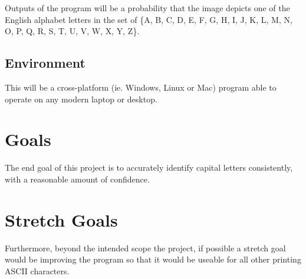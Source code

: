 \documentclass{article}
\begin{document}
Outputs of the program will be a probability that the image depicts one of the English alphabet letters in the 
set of \{A, B, C, D, E, F, G, H, I, J, K, L, M, N, O, P, Q, R, S, T, U, V, W, X, Y, Z\}.

\subsection{Environment}
This will be a cross-platform (ie. Windows, Linux or Mac) program able to operate on any modern laptop or desktop.

\section{Goals}
The end goal of this project is to accurately identify capital letters consistently, with a reasonable 
amount of confidence.
\section{Stretch Goals}
Furthermore, beyond the intended scope the project, if possible a stretch goal would be improving
the program so that it would be useable for all other printing ASCII characters.
\end{document}
